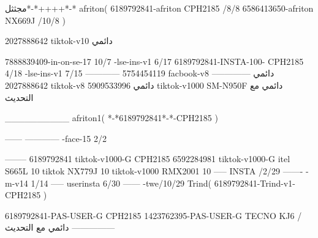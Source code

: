 مجثثل*-*++++*-*
afriton(
6189792841-afriton CPH2185  /8/8
6586413650-afriton NX669J  /10/8
)

2027888642 tiktok-v10
دائمي

7888839409-in-on-se-17 10/7
-lse-ins-v1 6/17
6189792841-INSTA-100- CPH2185 4/18
-lse-ins-v1 7/15
------------
5754454119 facbook-v8
دائمي
--------------
2027888642 tiktok-v8
دائمي
5909533996 tiktok-v1000  SM-N950F
دائمي مع التحديث

__________
afriton1(
*-*6189792841*-*-CPH2185
)


------
------------
-face-15 2/2

--------
6189792841 tiktok-v1000-G CPH2185 
6592284981 tiktok-v1000-G  itel S665L 10 tiktok  NX779J 10 tiktok-v1000  RMX2001 10\8
-----
 INSTA /2/29
-------
-m-v14 1/14
-----
userinsta 6/30
------
-twe/10/29
Trind(
6189792841-Trind-v1- CPH2185 
)


6189792841-PAS-USER-G CPH2185 
1423762395-PAS-USER-G TECNO KJ6  /دائمي مع التحديث
    ---------------
